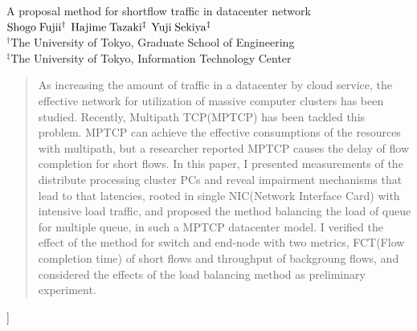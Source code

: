 \documentclass[11pt, a4paper, twocolumn]{jsarticle}
\begin{document}
\begin{center}
{\Large A proposal method for shortflow traffic in datacenter network }\\
\vspace{1em}
{\large ${\rm Shogo\;Fujii^{\dagger}}$
\hspace{1.0cm}${\rm Hajime\;Tazaki^{\ddagger}}$ \hspace{1.0cm}
${\rm Yuji\;Sekiya^{\ddagger}}$}\\
${}^{\dagger}$The University of Tokyo, Graduate School of Engineering\\
${}^{\ddagger}$The University of Tokyo, Information Technology
Center \\
\end{center}
\begin{quotation}
\begin{spacing}{0.6}
{\footnotesize
As increasing the amount of traffic in a datacenter by cloud service, the
effective network for utilization of massive computer clusters has been studied.
Recently, Multipath TCP(MPTCP) has been tackled this problem.
MPTCP can achieve the effective consumptions of the resources with multipath,
but a researcher reported MPTCP causes the delay of flow completion for short
flows.
In this paper, I presented measurements of the distribute processing cluster PCs
and reveal impairment mechanisms that lead to that latencies, rooted in single
NIC(Network Interface Card) with intensive load traffic, and proposed the method balancing
the load of queue for multiple queue, in such a MPTCP datacenter model.
I verified the effect of the method for switch and end-node with two metrics,
FCT(Flow completion time) of short flows and throughput of backgroung flows,
and considered the effects of the load balancing method as preliminary
experiment. }
\end{spacing}
\end{quotation}

\vspace{1.5cm}
]
\end{document}
